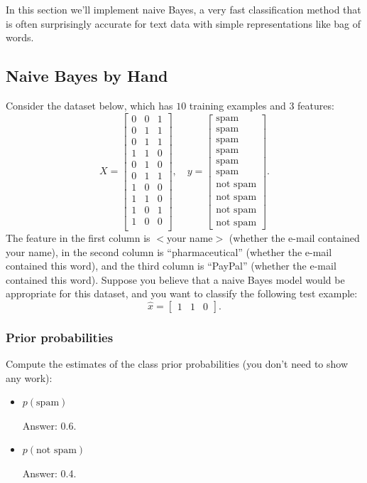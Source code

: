 \documentclass{article}
\def\ans#1{\par\gre{Answer: #1}}
\def\blu#1{{\color{blu}#1}}
\def\gre#1{{\color{gre}#1}}
\def\items#1{\begin{itemize}#1\end{itemize}}
\begin{document}
In this section we'll implement naive Bayes, a very fast classification method that is often surprisingly accurate for text data with simple representations like bag of words.


\subsection{Naive Bayes by Hand}

Consider the dataset below, which has $10$ training examples and $3$ features:
\[
X = \begin{bmatrix}0 & 0 & 1\\0 & 1 & 1\\ 0 & 1 & 1\\ 1 & 1 & 0\\0 & 1 & 0\\0 & 1 & 1\\1 & 0 & 0\\1 & 1 & 0\\1 & 0 & 1\\1 & 0 & 0\\\end{bmatrix}, \quad y = \begin{bmatrix}\text{spam}\\\text{spam}\\\text{spam}\\\text{spam}\\\text{spam}\\\text{spam}\\\text{not spam}\\\text{not spam}\\\text{not spam}\\\text{not spam}\end{bmatrix}.
\]
The feature in the first column is $<$your name$>$ (whether the e-mail contained your name), in the second column is ``pharmaceutical'' (whether the e-mail contained this word), and the third column is ``PayPal'' (whether the e-mail contained this word).
Suppose you believe that a naive Bayes model would be appropriate for this dataset, and you want to classify the following test example:
\[
\hat{x} = \begin{bmatrix}1 & 1 & 0\end{bmatrix}.
\]

\subsubsection{Prior probabilities}

\blu{Compute the estimates of the class prior probabilities} (you don't need to show any work):
\items{
\item$ p(\text{spam})$ \ans {0.6}.
\item $p(\text{not spam})$ \ans{0.4}.
}
\end{document}
